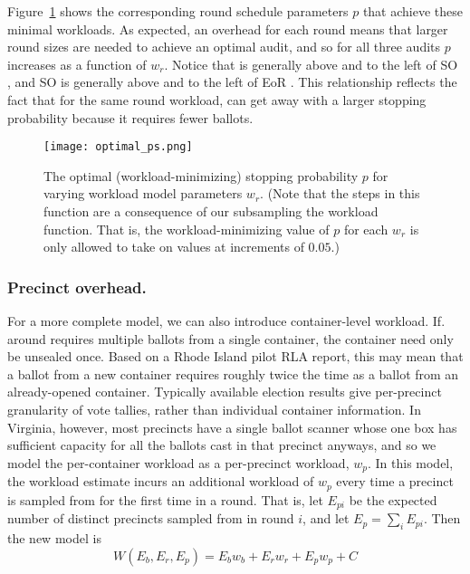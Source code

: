 Figure~\ref{fig:optimal_ps} shows the corresponding round schedule parameters $p$ that achieve these minimal workloads. As expected, an overhead for each round means that larger round sizes are needed to achieve an optimal audit, and so for all three audits $p$ increases as a function of $w_r$. Notice that \Providence is generally above and to the left of SO \BRAVO, and SO \BRAVO is generally above and to the left of EoR \BRAVO. This relationship reflects the fact that for the same round workload, \Providence can get away with a larger stopping probability because it requires fewer ballots.
\begin{figure}[h!]
\texttt{[image: optimal\_ps.png]}
\caption{The optimal (workload-minimizing) stopping probability $p$ for varying workload model parameters $w_r$. (Note that the steps in this function are a consequence of our subsampling the workload function. That is, the workload-minimizing value of $p$ for each $w_r$ is only allowed to take on values at increments of $0.05$.)}
\label{fig:optimal_ps}
\end{figure}

\subsubsection{Precinct overhead.} For a more complete model, we can also introduce container-level workload. If. around requires multiple ballots from a single container, the container need only be unsealed once. Based on a Rhode Island pilot RLA report\cite{RI-report}, this may mean that a ballot from a new container requires roughly twice the time as a ballot from an already-opened container. Typically available election results give per-precinct granularity of vote tallies, rather than individual container information. In Virginia, however, most precincts have a single ballot scanner whose one box has sufficient capacity for all the ballots cast in that precinct anyways, and so we model the per-container workload as a per-precinct workload, $w_p$. In this model, the workload estimate incurs an additional workload of $w_p$ every time a precinct is sampled from for the first time in a round. That is, let $E_{pi}$ be the expected number of distinct precincts sampled from in round $i$, and let $E_p=\sum_i E_{pi}$. Then the new model is
\begin{equation}
W(E_b, E_r, E_p) = E_b w_b + E_r w_r + E_p w_p + C
\label{eq:round_and_precinct_workload}
\end{equation}

